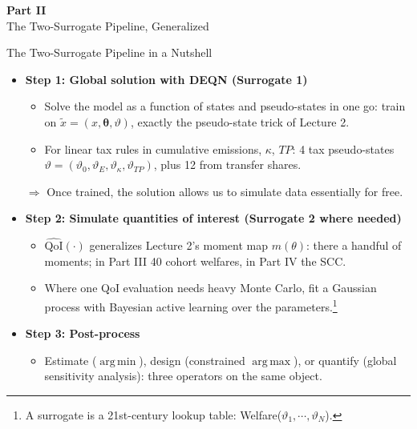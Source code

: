 \documentclass[aspectratio=169,11pt]{beamer}
\newcommand{\keyc}[1]{\textcolor{uzhblue}{#1}}
\DeclareMathOperator*{\argmin}{arg\,min}
\DeclareMathOperator*{\argmax}{arg\,max}
\begin{document}

\begin{frame}{}
\vfill
\begin{center}
{\Huge \textcolor{uzhblue}{\textbf{Part II}}}\\[12pt]
{\LARGE The Two-Surrogate Pipeline, Generalized}
\end{center}
\vfill
\end{frame}

\begin{frame}{The Two-Surrogate Pipeline in a Nutshell}
\small
  \begin{itemize}
    \item \textbf{Step 1: Global solution with DEQN (Surrogate 1)}
      \begin{itemize}
        \item \keyc{Solve the model as a function of states and pseudo-states in one go}: train on $\tilde{x} = (x, \bm{\theta}, \vartheta)$, exactly the pseudo-state trick of Lecture 2.
        \item \keyc{For linear tax rules in cumulative emissions, $\kappa$, $TP$}: 4 tax pseudo-states $\vartheta = (\vartheta_0, \vartheta_E, \vartheta_\kappa , \vartheta_{TP})$, plus \keyc{12 from transfer shares}.
      \end{itemize}
      $\Rightarrow$ \keyc{Once trained, the solution allows us to simulate data essentially for free}.
    \item \textbf{Step 2: Simulate quantities of interest (Surrogate 2 where needed)}
      \begin{itemize}
        \item $\widehat{\mathrm{QoI}}(\cdot)$ generalizes Lecture 2's moment map $m(\theta)$: there a handful of moments; in Part III 40 cohort welfares, in Part IV the SCC.
        \item Where one QoI evaluation needs heavy Monte Carlo, fit a Gaussian process with Bayesian active learning over the parameters.\footnote{A surrogate is a 21st-century lookup table: Welfare($\vartheta_1,\cdots,\vartheta_N$).}
      \end{itemize}
    \item \textbf{Step 3: Post-process}
      \begin{itemize}
        \item Estimate ($\argmin$), design (constrained $\argmax$), or quantify (global sensitivity analysis): three operators on the same object.
      \end{itemize}
  \end{itemize}
\end{frame}
\end{document}
